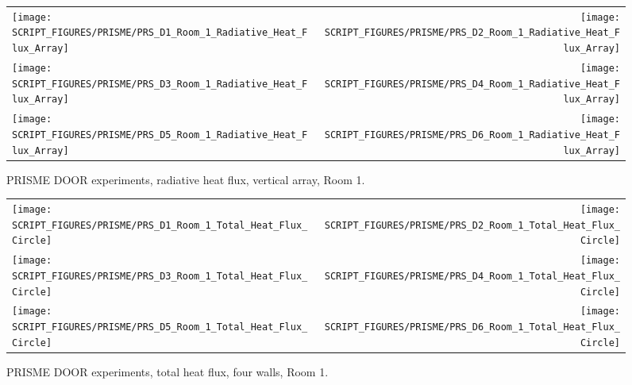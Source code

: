 \newpage

\begin{figure}[p]
\begin{tabular*}{\textwidth}{l@{\extracolsep{\fill}}r}
\texttt{[image: SCRIPT\_FIGURES/PRISME/PRS\_D1\_Room\_1\_Radiative\_Heat\_Flux\_Array]} &
\texttt{[image: SCRIPT\_FIGURES/PRISME/PRS\_D2\_Room\_1\_Radiative\_Heat\_Flux\_Array]} \\
\texttt{[image: SCRIPT\_FIGURES/PRISME/PRS\_D3\_Room\_1\_Radiative\_Heat\_Flux\_Array]} &
\texttt{[image: SCRIPT\_FIGURES/PRISME/PRS\_D4\_Room\_1\_Radiative\_Heat\_Flux\_Array]} \\
\texttt{[image: SCRIPT\_FIGURES/PRISME/PRS\_D5\_Room\_1\_Radiative\_Heat\_Flux\_Array]} &
\texttt{[image: SCRIPT\_FIGURES/PRISME/PRS\_D6\_Room\_1\_Radiative\_Heat\_Flux\_Array]}
\end{tabular*}
\caption[PRISME DOOR experiments, radiative heat flux, vertical array, Room 1]{PRISME DOOR experiments, radiative heat flux, vertical array, Room 1.}
\label{PRISME_Wall_Array_RHF_Room_1}
\end{figure}

\begin{figure}[p]
\begin{tabular*}{\textwidth}{l@{\extracolsep{\fill}}r}
\texttt{[image: SCRIPT\_FIGURES/PRISME/PRS\_D1\_Room\_1\_Total\_Heat\_Flux\_Circle]} &
\texttt{[image: SCRIPT\_FIGURES/PRISME/PRS\_D2\_Room\_1\_Total\_Heat\_Flux\_Circle]} \\
\texttt{[image: SCRIPT\_FIGURES/PRISME/PRS\_D3\_Room\_1\_Total\_Heat\_Flux\_Circle]} &
\texttt{[image: SCRIPT\_FIGURES/PRISME/PRS\_D4\_Room\_1\_Total\_Heat\_Flux\_Circle]} \\
\texttt{[image: SCRIPT\_FIGURES/PRISME/PRS\_D5\_Room\_1\_Total\_Heat\_Flux\_Circle]} &
\texttt{[image: SCRIPT\_FIGURES/PRISME/PRS\_D6\_Room\_1\_Total\_Heat\_Flux\_Circle]}
\end{tabular*}
\caption[PRISME DOOR experiments, total heat flux, four walls, Room 1]{PRISME DOOR experiments, total heat flux, four walls, Room 1.}
\label{PRISME_Wall_Circle_THF_Room_1}
\end{figure}

